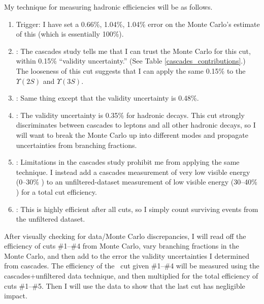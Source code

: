 My technique for measuring hadronic efficiencies will be as follows.
\begin{enumerate}

  \item Trigger: I have set a 0.66\%, 1.04\%, 1.04\% error on the
    Monte Carlo's estimate of this (which is essentially 100\%).

  \item \dxy: The cascades study tells me that I can trust the Monte
    Carlo for this cut, within 0.15\% ``validity uncertainty.''  (See
    Table \ref{cascades_contributions}.)  The looseness of this cut
    suggests that I can apply the same 0.15\% to the $\Upsilon(2S)$
    and $\Upsilon(3S)$.

  \item \dz: Same thing except that the validity uncertainty is
    0.48\%.

  \item \pone: The validity uncertainty is 0.35\% for hadronic decays.
    This cut strongly discriminates between cascades to leptons and
    all other hadronic decays, so I will want to break the Monte Carlo
    up into different modes and propagate uncertainties from branching
    fractions.

  \item \visen: Limitations in the cascades study prohibit me from
    applying the same technique.  I instead add a cascades
    measurement of very low visible energy (0--30\% \ecom) to an
    unfiltered-dataset measurement of low visible energy (30--40\%
    \ecom) for a total cut efficiency.

  \item \lfourdec: This is highly efficient after all cuts, so I
    simply count surviving events from the unfiltered dataset.

\end{enumerate}

After visually checking for data/Monte Carlo discrepancies, I will
read off the efficiency of cuts \#1--\#4 from Monte Carlo, vary
branching fractions in the Monte Carlo, and then add to the error the
validity uncertainties I determined from cascades.  The efficiency of
the \visen\ cut given \#1--\#4 will be measured using the
cascades+unfiltered data technique, and then multiplied for the total
efficiency of cuts \#1--\#5.  Then I will use the data to show that
the last cut has negligible impact.

